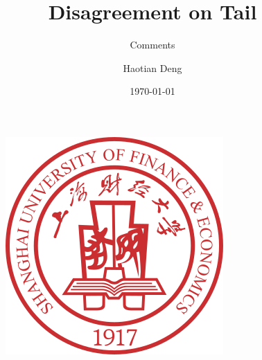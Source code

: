 \documentclass[UTF8, 16pt]{beamer}
\author[Haotian Deng] %
{
Haotian Deng
}
\title[Disagreement on Tail]{Disagreement on Tail}
\subtitle{Comments}
\institute[SUFE]
{
Shanghai University of Finance and Economics
}
\date[VLC 2021]
{\today}
\begin{document}
\begin{CJK*}{UTF8}{gbsn}

\begin{frame}[noframenumbering]
	\titlepage
	\vspace{-0.5cm}
    \begin{figure}[htpb] 
        \begin{center}
            \includegraphics[width=0.19 \linewidth]{sufe_logo.png}
        \end{center}  
    \end{figure}
\end{frame}




\end{CJK*}
\end{document}
